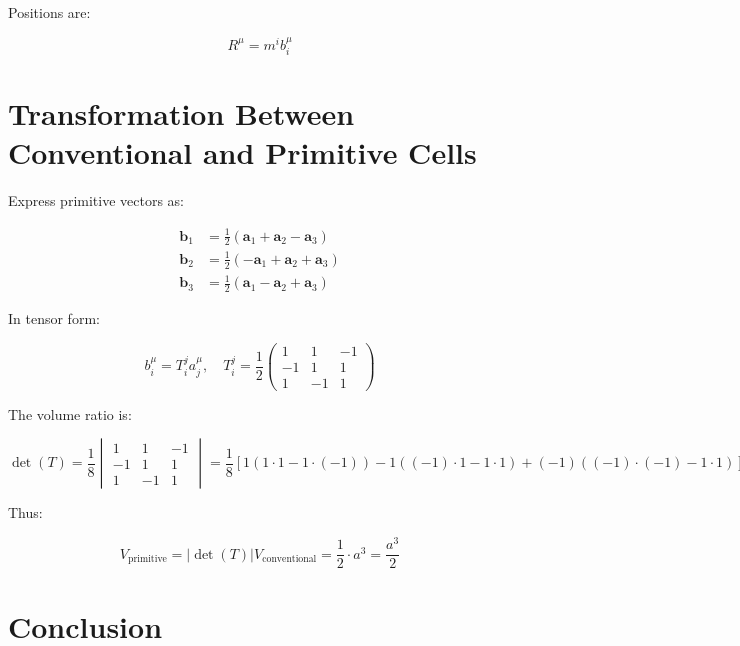 \documentclass[a4paper,12pt]{article}
\newcommand{\bvec}[1]{\mathbf{#1}} %
\begin{document}
	Positions are:
	
	\begin{equation}
		R^\mu = m^i b_i^\mu
	\end{equation}
	
	\section{Transformation Between Conventional and Primitive Cells}
	
	Express primitive vectors as:
	
	\begin{align}
		\bvec{b}_1 &= \frac{1}{2} (\bvec{a}_1 + \bvec{a}_2 - \bvec{a}_3) \\
		\bvec{b}_2 &= \frac{1}{2} (-\bvec{a}_1 + \bvec{a}_2 + \bvec{a}_3) \\
		\bvec{b}_3 &= \frac{1}{2} (\bvec{a}_1 - \bvec{a}_2 + \bvec{a}_3)
	\end{align}
	
	In tensor form:
	
	\begin{equation}
		b_i^\mu = T_i^j a_j^\mu, \quad T_i^j = \frac{1}{2} \begin{pmatrix}
			1 & 1 & -1 \\
			-1 & 1 & 1 \\
			1 & -1 & 1
		\end{pmatrix}
	\end{equation}
	
	The volume ratio is:
	
	\begin{equation}
		\det(T) = \frac{1}{8} \begin{vmatrix}
			1 & 1 & -1 \\
			-1 & 1 & 1 \\
			1 & -1 & 1
		\end{vmatrix} = \frac{1}{8} [1(1 \cdot 1 - 1 \cdot (-1)) - 1((-1) \cdot 1 - 1 \cdot 1) + (-1)((-1) \cdot (-1) - 1 \cdot 1)] = \frac{1}{2}
	\end{equation}
	
	Thus:
	
	\begin{equation}
		V_{\text{primitive}} = |\det(T)| V_{\text{conventional}} = \frac{1}{2} \cdot a^3 = \frac{a^3}{2}
	\end{equation}
	
	\section{Conclusion}
	
\end{document}

